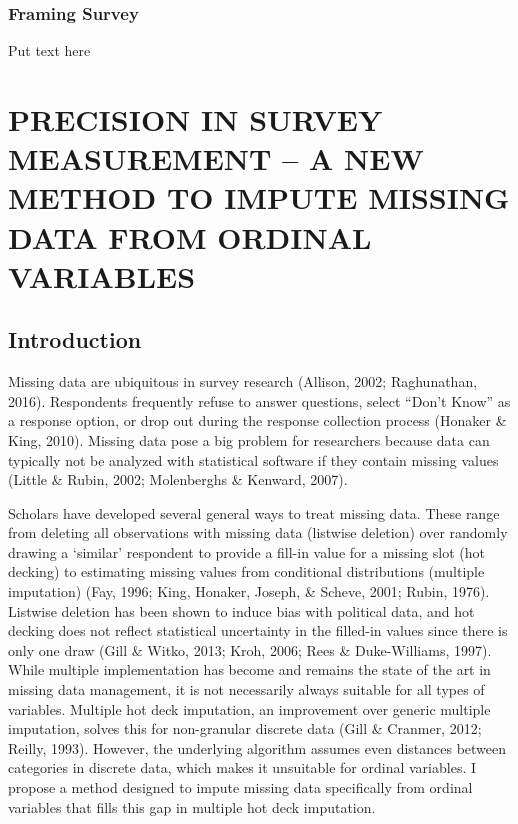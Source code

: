 \documentclass[12pt,econ]{sources/authesis}
\begin{document}
\hypertarget{ordblock-results-framing}{%
\subsection{Framing Survey}\label{ordblock-results-framing}}

Put text here

\hypertarget{ordmiss}{%
\chapter{PRECISION IN SURVEY MEASUREMENT -- A NEW METHOD TO IMPUTE MISSING DATA FROM ORDINAL VARIABLES}\label{ordmiss}}

\hypertarget{ordmiss-intro}{%
\section{Introduction}\label{ordmiss-intro}}

Missing data are ubiquitous in survey research (Allison, 2002; Raghunathan, 2016). Respondents frequently refuse to answer questions, select ``Don't Know'' as a response option, or drop out during the response collection process (Honaker \& King, 2010). Missing data pose a big problem for researchers because data can typically not be analyzed with statistical software if they contain missing values (Little \& Rubin, 2002; Molenberghs \& Kenward, 2007).

Scholars have developed several general ways to treat missing data. These range from deleting all observations with missing data (listwise deletion) over randomly drawing a `similar' respondent to provide a fill-in value for a missing slot (hot decking) to estimating missing values from conditional distributions (multiple imputation) (Fay, 1996; King, Honaker, Joseph, \& Scheve, 2001; Rubin, 1976). Listwise deletion has been shown to induce bias with political data, and hot decking does not reflect statistical uncertainty in the filled-in values since there is only one draw (Gill \& Witko, 2013; Kroh, 2006; Rees \& Duke-Williams, 1997). While multiple implementation has become and remains the state of the art in missing data management, it is not necessarily always suitable for all types of variables. Multiple hot deck imputation, an improvement over generic multiple imputation, solves this for non-granular discrete data (Gill \& Cranmer, 2012; Reilly, 1993). However, the underlying algorithm assumes even distances between categories in discrete data, which makes it unsuitable for ordinal variables. I propose a method designed to impute missing data specifically from ordinal variables that fills this gap in multiple hot deck imputation.
\end{document}
